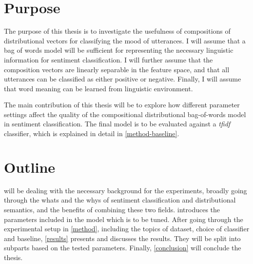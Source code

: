 \section{Purpose}
The purpose of this thesis is to investigate the usefulness of compositions of distributional vectors for classifying the mood of utterances. I will assume that a bag of words model will be sufficient for representing the necessary linguistic information for sentiment classification. I will further assume that the composition vectors are linearly separable in the feature space, and that all utterances can be classified as either positive or negative. Finally, I will assume that word meaning can be learned from linguistic environment.

The main contribution of this thesis will be to explore how different parameter settings affect the quality of the compositional distributional bag-of-words model in sentiment classification. The final model is to be evaluated against a \emph{tfidf} classifier, which is explained in detail in \cref{method-baseline}.

\section{Outline}
\label{outline}

 will be dealing with the necessary background for the experiments, broadly going through the whats and the whys of sentiment classification and distributional semantics, and the benefits of combining these two fields.  introduces the parameters included in the model which is to be tuned. After going through the experimental setup in \cref{method}, including the topics of dataset, choice of classifier and baseline, \cref{results} presents and discusses the results. They will be split into subparts based on the tested parameters. Finally, \cref{conclusion} will conclude the thesis.
